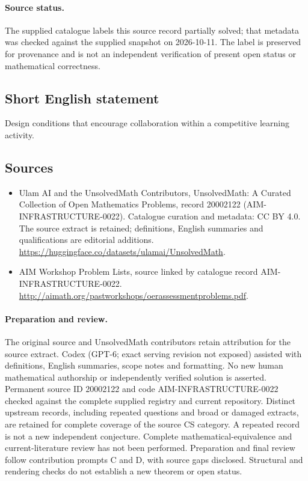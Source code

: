 \documentclass[11pt]{article}
\begin{document}
\paragraph{Source status.}
The supplied catalogue labels this source record partially solved; that metadata was checked against the supplied snapshot on 2026-10-11. The label is preserved for provenance and is not an independent verification of present open status or mathematical correctness.
\subsection{Short English statement}
Design conditions that encourage collaboration within a competitive learning activity.
\subsection{Sources}
\begin{itemize}
\item[\hypertarget{source:20002122:1}{S1}] Ulam AI and the UnsolvedMath Contributors, UnsolvedMath: A Curated Collection of Open Mathematics Problems, record 20002122 (AIM-INFRASTRUCTURE-0022). Catalogue curation and metadata: CC BY 4.0. The source extract is retained; definitions, English summaries and qualifications are editorial additions.
\url{https://huggingface.co/datasets/ulamai/UnsolvedMath}.
\item[\hypertarget{source:20002122:2}{S2}] AIM Workshop Problem Lists, source linked by catalogue record AIM-INFRASTRUCTURE-0022.
\url{http://aimath.org/pastworkshops/oerassessmentproblems.pdf}.
\end{itemize}
\paragraph{Preparation and review.}
The original source and UnsolvedMath contributors retain attribution for the source extract. Codex (GPT-6; exact serving revision not exposed) assisted with definitions, English summaries, scope notes and formatting. No new human mathematical authorship or independently verified solution is asserted. Permanent source ID 20002122 and code AIM-INFRASTRUCTURE-0022 checked against the complete supplied registry and current repository. Distinct upstream records, including repeated questions and broad or damaged extracts, are retained for complete coverage of the source CS category. A repeated record is not a new independent conjecture. Complete mathematical-equivalence and current-literature review has not been performed. Preparation and final review follow contribution prompts C and D, with source gaps disclosed. Structural and rendering checks do not establish a new theorem or open status.
\label{end:20002122}
\end{document}
